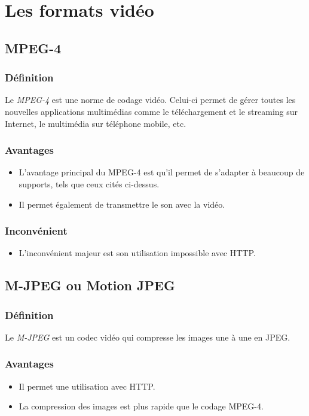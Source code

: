 	\section{Les formats vidéo}
		\subsection{MPEG-4}
		\subsubsection{Définition}
		Le \textit{MPEG-4} est une norme de codage vidéo. Celui-ci
		permet de gérer toutes les nouvelles applications multimédias comme le
		téléchargement et le streaming sur Internet, le multimédia sur téléphone
		mobile, etc.
		\subsubsection{Avantages}
		\begin{itemize}
		  \item L'avantage principal du MPEG-4 est qu'il permet de s'adapter à beaucoup de
		supports, tels que ceux cités ci-dessus.
		  \item Il permet également de transmettre le son avec la vidéo.
		\end{itemize}
		\subsubsection{Inconvénient}
		\begin{itemize}
		  \item L'inconvénient majeur est son utilisation impossible avec HTTP.
		\end{itemize}
		
		\subsection{M-JPEG ou Motion JPEG}
		\subsubsection{Définition}
		Le \textit{M-JPEG} est un codec vidéo qui compresse les images une à une en
		JPEG.
		\subsubsection{Avantages}
		\begin{itemize}
		  \item Il permet une utilisation avec HTTP.
		  \item La compression des images est plus rapide que le codage MPEG-4.
		\end{itemize}
		
